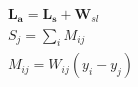 \documentclass[preview]{standalone}
\begin{document}
\begin{align*}
\mathbf{ L _a} = \mathbf{ L _s} + \mathbf{W}_{sl} \\  S_j  = \sum_i  M_{ij}  \\  M_{ij}  = W_{ij}(y_i - y_j)
\end{align*}
\end{document}
